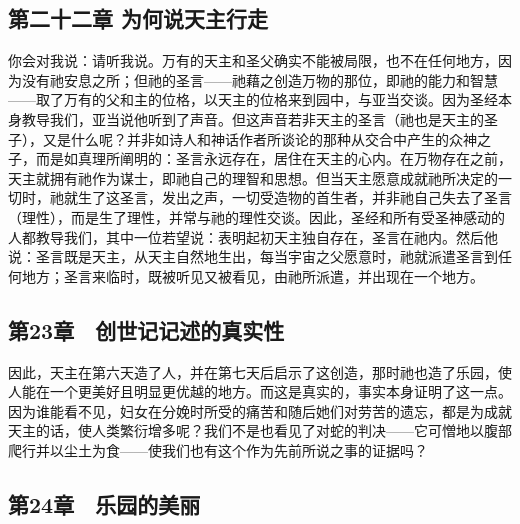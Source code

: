 
\subsection{第二十二章 为何说天主行走}

你会对我说：请听我说。万有的天主和圣父确实不能被局限，也不在任何地方，因为没有祂安息之所；但祂的圣言——祂藉之创造万物的那位，即祂的能力和智慧——取了万有的父和主的位格，以天主的位格来到园中，与亚当交谈。因为圣经本身教导我们，亚当说他听到了声音。但这声音若非天主的圣言（祂也是天主的圣子），又是什么呢？并非如诗人和神话作者所谈论的那种从交合中产生的众神之子，而是如真理所阐明的：圣言永远存在，居住在天主的心内。在万物存在之前，天主就拥有祂作为谋士，即祂自己的理智和思想。但当天主愿意成就祂所决定的一切时，祂就生了这圣言，发出之声，一切受造物的首生者，并非祂自己失去了圣言（理性），而是生了理性，并常与祂的理性交谈。因此，圣经和所有受圣神感动的人都教导我们，其中一位若望说：表明起初天主独自存在，圣言在祂内。然后他说：圣言既是天主，从天主自然地生出，每当宇宙之父愿意时，祂就派遣圣言到任何地方；圣言来临时，既被听见又被看见，由祂所派遣，并出现在一个地方。\par


\subsection{第23章　创世记记述的真实性}

因此，天主在第六天造了人，并在第七天后启示了这创造，那时祂也造了乐园，使人能在一个更美好且明显更优越的地方。而这是真实的，事实本身证明了这一点。因为谁能看不见，妇女在分娩时所受的痛苦和随后她们对劳苦的遗忘，都是为成就天主的话，使人类繁衍增多呢？我们不是也看见了对蛇的判决——它可憎地以腹部爬行并以尘土为食——使我们也有这个作为先前所说之事的证据吗？\par


\subsection{第24章　乐园的美丽}

